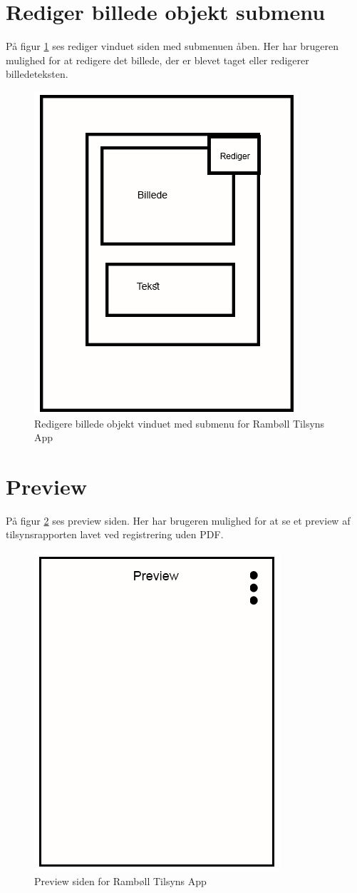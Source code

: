 \section{Rediger billede objekt submenu}\label{sec:RedigerBilledeSubMock}
På figur \ref{fig:RedigerBilledeSubMock} ses rediger vinduet siden med submenuen åben. Her har brugeren mulighed for at redigere det billede, der er blevet taget eller redigerer billedeteksten.

\begin{figure}[H]
	\centering
	\includegraphics[width=0.4\linewidth]{MockUps/Mock/Ramboell-RedigerBilledeOpbjekt-Sub}
	\caption{Redigere billede objekt vinduet med submenu for Rambøll Tilsyns App}
	\label{fig:RedigerBilledeSubMock}
\end{figure}

\clearpage

\section{Preview}\label{sec:PreviewMock}
På figur \ref{fig:PreviewMock} ses preview siden. Her har brugeren mulighed for at se et preview af tilsynsrapporten lavet ved registrering uden PDF.

\begin{figure}[H]
	\centering
	\includegraphics[width=0.4\linewidth]{MockUps/Mock/Ramboell-Preview}
	\caption{Preview siden for Rambøll Tilsyns App}
	\label{fig:PreviewMock}
\end{figure}

